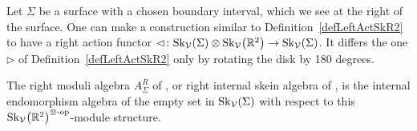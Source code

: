 \documentclass[pdftex]{sigma}%
\numberwithin{equation}{section}
\begin{document}
\begin{Definition}
Let $\Sigma$ be a surface with a chosen boundary interval, which we see at the right of the surface. One can make a construction similar to Definition~\ref{defLeftActSkR2} to have a right action functor $\lhd \colon {\rm Sk}_\mathcal{V}(\Sigma) \otimes {\rm Sk}_\mathcal{V}\big(\mathbb{R}^2\big)\to {\rm Sk}_\mathcal{V}(\Sigma)$. It differs the one $\rhd$ of Definition~\ref{defLeftActSkR2} only by rotating the disk by 180 degrees.

The right moduli algebra $A_\Sigma^R$ of \cite[Section~5.2]{BBJ}, or right internal skein algebra of \cite{Gunningham}, is the internal endomorphism algebra of the empty set in ${\rm Sk}_\mathcal{V}(\Sigma)$ with respect to this ${\rm Sk}_\mathcal{V}\big(\mathbb{R}^2\big)^{\otimes\text{-}{\rm op}}$-module structure.
\end{Definition}
\end{document}
